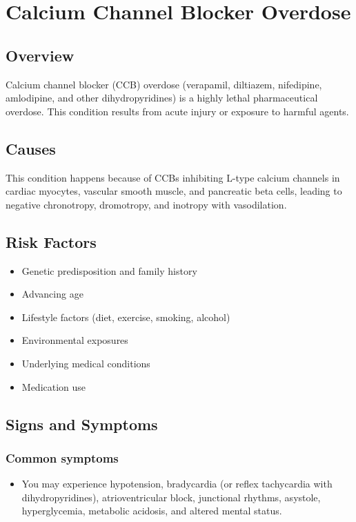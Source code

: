 \chapter{Calcium Channel Blocker Overdose}
\label{sec:CCB Overdose}

\section{Overview}
Calcium channel blocker (CCB) overdose (verapamil, diltiazem, nifedipine, amlodipine, and other dihydropyridines) is a highly lethal pharmaceutical overdose. This condition results from acute injury or exposure to harmful agents.
\section{Causes}
This condition happens because of CCBs inhibiting L-type calcium channels in cardiac myocytes, vascular smooth muscle, and pancreatic beta cells, leading to negative chronotropy, dromotropy, and inotropy with vasodilation.     
\section{Risk Factors}

\begin{itemize}[noitemsep]
  \item Genetic predisposition and family history
  \item Advancing age
  \item Lifestyle factors (diet, exercise, smoking, alcohol)
  \item Environmental exposures
  \item Underlying medical conditions
  \item Medication use
\end{itemize}
\section{Signs and Symptoms}

\subsection{Common symptoms}
\begin{itemize}[noitemsep]
  \item You may experience hypotension, bradycardia (or reflex tachycardia with dihydropyridines), atrioventricular block, junctional rhythms, asystole, hyperglycemia, metabolic acidosis, and altered mental status. 
  \end{itemize}

